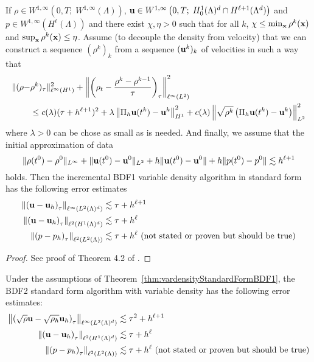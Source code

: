 \documentclass[letterpaper]{erdc}
\begin{document}
\begin{theorem}\label{thm:vardensityStandardFormBDF1}
If $\rho \in W^{1,\infty}\left(0,T; \; W^{1,\infty}(\Lambda) \right)$, $\textbf{u} \in W^{1,\infty}\left(0,T;\; H^1_0(\Lambda)^d\cap H^{\ell+1}(\Lambda^d) \right)$ and $p\in W^{1,\infty}\left( H^{\ell}(\Lambda)\right)$ and there exist $\chi, \eta >0 $ such that for all $k$, $\chi \leq \min_{\textbf{x}} \rho^k(\textbf{x})$ and $\sup_{\textbf{x}} \rho^k(\textbf{x}) \leq \eta$. Assume (to decouple the density from velocity) that we can construct a sequence $(\rho^k)_k$ from a sequence $(\textbf{u}^k)_k$ of velocities in such a way that
\begin{align}
  \|(\rho - &\rho^k)_{\tau}\|^2_{\ell^{\infty}(H^1)} + \left\| \left( \rho_t - \frac{\rho^k - \rho^{k-1}}{\tau} \right)_{\tau} \right\|^2_{\ell^{\infty}(L^2)}\\
  &\leq c(\lambda)(\tau + h^{\ell+1})^2 + \lambda \left\| \Pi_h\textbf{u}(t^k) - \textbf{u}^k  \right\|^2_{H^1} + c(\lambda)\left\|\sqrt{\rho^k} \left(\Pi_h\textbf{u}(t^k) - \textbf{u}^k\right)\right\|^2_{L^2}
  \end{align}
  where $\lambda>0$ can be chose as small as is needed. And finally, we assume that the initial approximation of data 
  \begin{equation}
    \|\rho(t^0) - \rho^0\|_{L^{\infty}} + \|\textbf{u}(t^0)-\textbf{u}^{0}\|_{L^2} + h\|\textbf{u}(t^0) - \textbf{u}^0\| + h\|p(t^0) - p^0\| \lesssim h^{\ell+1}
  \end{equation}
  holds.  Then the incremental BDF1 variable density algorithm in standard form has the following error estimates
  \begin{align}
    \left\|\left(\textbf{u} - \textbf{u}_h\right)_{\tau}\right\|_{\ell^{\infty}(L^2(\Lambda)^d)} &\lesssim \tau + h^{\ell+1}\\
    \left\|\left(\textbf{u} - \textbf{u}_h\right)_{\tau}\right\|_{\ell^{2}(H^1(\Lambda)^d)} &\lesssim \tau + h^{\ell}\\
    \left\|\left(p - p_h\right)_{\tau}\right\|_{\ell^{2}(L^2(\Lambda))} & \lesssim \tau + h^{\ell}  \mbox{  (not stated or proven but should be true)}
  \end{align}
\end{theorem}
\begin{proof}
  See proof of Theorem 4.2 of \cite{guermond2011error}.
\end{proof}

\begin{conjecture}
  Under the assumptions of Theorem~\ref{thm:vardensityStandardFormBDF1}, the BDF2 standard form algorithm with variable density has the following error estimates:
  \begin{align}
    \left\| \left(\sqrt{\rho} \textbf{u} - \sqrt{\rho_h} \textbf{u}_h \right)_{\tau} \right\|_{\ell^{\infty}(L^2(\Lambda)^d)} &\lesssim \tau^2 + h^{\ell+1}\\
    \left\| \left(\textbf{u} - \textbf{u}_h \right)_{\tau} \right\|_{\ell^2(H^1(\Lambda)^d)} &\lesssim \tau + h^{\ell}\\
    \left\|\left(p - p_h\right)_{\tau} \right\|_{\ell^{2}(L^2(\Lambda))} &\lesssim \tau + h^{\ell}  \mbox{  (not stated or proven but should be true)}
  \end{align}
\end{conjecture}
\end{document}
